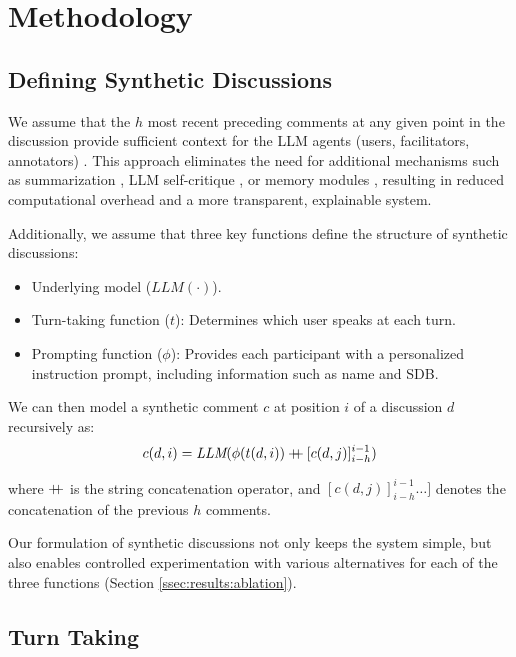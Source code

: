 %

\section{Methodology}
\label{sec:methodology}

\subsection{Defining Synthetic Discussions}
\label{ssec:methodology:discussions}

We assume that the $h$ most recent preceding comments at any given point in the discussion provide sufficient context for the \ac{LLM} agents (users, facilitators, annotators) \cite{pavlopoulos_2020_toxicity}. This approach eliminates the need for additional mechanisms such as summarization \cite{balog_2024}, \ac{LLM} self-critique \cite{yu_2024_fincon}, or memory modules \cite{Vezhnevets2023GenerativeAM}, resulting in reduced computational overhead and a more transparent, explainable system.

Additionally, we assume that three key functions define the structure of synthetic discussions:
\begin{itemize}[nosep, noitemsep]
    \item Underlying model ($\textit{LLM}(\cdot)$).
    \item Turn-taking function ($t$): Determines which user speaks at each turn.
    \item Prompting function ($\phi$): Provides each participant with a personalized instruction prompt, including information such as name and \ac{SDB}.
\end{itemize}

We can then model a synthetic comment $c$ at position $i$ of a discussion $d$ recursively as:
\begin{equation}
\label{eq:comment}
    c(d, i) = \textit{LLM}(\phi(t(d, i)) \mathbin{{+}\mspace{-8mu}{+}} [c(d, j)]^{i-1}_{i-h})
\end{equation}

\noindent where $\mathbin{{+}\mspace{-8mu}{+}}$ is the string concatenation operator, and $[c(d,j)]_{i-h}^{i-1}\dots]$ denotes the concatenation of the previous $h$ comments.

Our formulation of synthetic discussions not only keeps the system simple, but also enables controlled experimentation with various alternatives for each of the three functions (Section \ref{ssec:results:ablation}).


\subsection{Turn Taking}
\label{ssec:methodology:turn}

